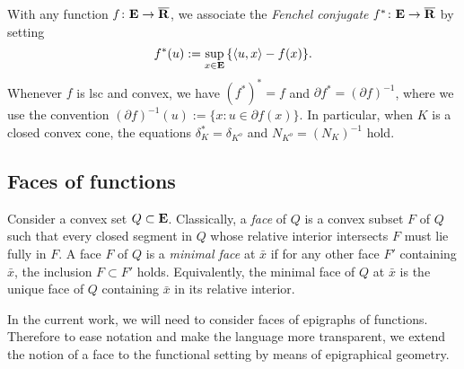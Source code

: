 \documentclass[smallextended,numbook]{svjour3}
\begin{document}
With any function $f\colon{{\bf E}}\to\overline{{\bf R}}$, we associate the {\em Fenchel conjugate} $f^{*}\colon{{\bf E}}\to\overline{{\bf R}}$ by setting $$f^{*}(u):= \sup_{x\in{{\bf E}}}\, \{\langle u,x \rangle - f(x)\} .$$
Whenever $f$ is lsc and convex,  we have $(f^*)^{*}=f$ and $\partial f^{*}= (\partial f)^{-1}$, where we use the convention $(\partial f)^{-1}(u):=\{x: u\in\partial f(x)\}$.
In particular, when $K$ is a closed convex cone, the equations $\delta_K^{*}=\delta_{K^{o}}$ and $N_{K^{o}}=(N_K)^{-1}$ hold.

\subsection{Faces of functions}\label{subsec:face_gen}
Consider a convex set $Q\subset{{\bf E}}$. Classically, a {\em face} of $Q$ is a convex subset $F$ of $Q$ such that every closed segment in $Q$ whose relative interior intersects $F$ must lie fully in $F$. A face $F$ of $Q$ is a {\em minimal face} at $\bar{x}$ if for any other face $F'$ containing $\bar{x}$, the inclusion $F\subset F'$ holds. Equivalently, the minimal face of $Q$ at $\bar{x}$ is the unique face of $Q$ containing $\bar{x}$ in its relative interior.

In the current work, we will need to consider faces of epigraphs of functions. Therefore to ease notation and make the language more transparent, we extend the notion of a face to the functional setting by means of epigraphical geometry.
\end{document}
